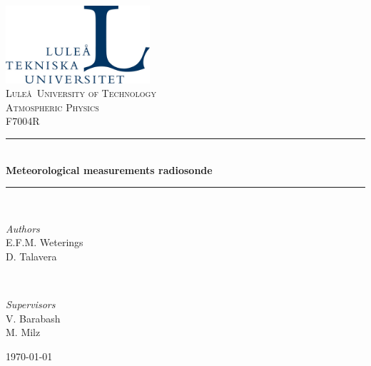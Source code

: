 
\begin{titlepage} %
	\center %
	\newcommand{\HRule}{\rule{\linewidth}{0.5mm}} %
	
	
	\includegraphics[width=0.4\textwidth, trim=0 0 0 -2cm]{figures/LTU_logo.jpg}\\[1cm]
		
	
	\textsc{\Huge Lule\aa \ University of Technology}\\[1.5cm]
	
	\textsc{\LARGE Atmospheric Physics}\\[0.3cm]
	
	\textsc{\large F7004R}\\[0.5cm]
	
	
	\HRule\\[0.4cm]
	
	{\Huge\bfseries Meteorological measurements radiosonde}\\[0.4cm]
	
	\HRule\\[1.5cm]
	
	
	\begin{minipage}{0.4\textwidth}
		\begin{flushleft}
			\large
			\textit{Authors}\\
			E.F.M. Weterings\\
			D. Talavera
		\end{flushleft}
	\end{minipage}
	~
	\begin{minipage}{0.4\textwidth}
		\begin{flushright}
			\large
			\textit{Supervisors}\\
			V. Barabash\\
			M. Milz
		\end{flushright}
	\end{minipage}
	
	
	\vfill\vfill\vfill %
	
	{\large\today} %
	
	
\end{titlepage}